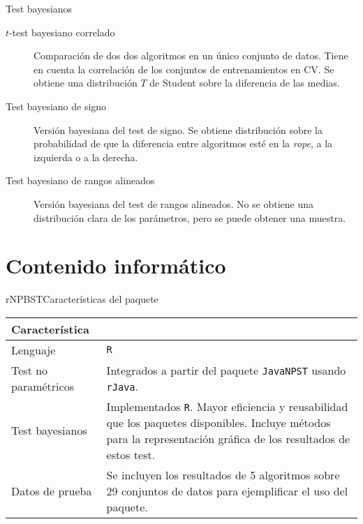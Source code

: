 \documentclass[leqno]{beamer}
\theoremstyle{definition_wo_parentheses}
\begin{document}
\begin{frame}{Test bayesianos}
\begin{description}
\item[$t$-test bayesiano correlado] Comparación de dos
dos algoritmos en un único conjunto de datos. Tiene en cuenta
la correlación de los conjuntos de entrenamientos en CV.
Se obtiene una distribución $T$ de Student sobre la
diferencia de las medias.
\item[Test bayesiano de signo] Versión bayesiana del test de 
signo. Se obtiene distribución sobre la probabilidad de que 
la diferencia entre algoritmos esté en la \textit{rope}, a la 
izquierda o a la derecha.
\item[Test bayesiano de rangos alineados] Versión bayesiana 
del test de rangos alineados. No se obtiene una distribución clara de los parámetros, 
pero se puede obtener una muestra. 
\end{description}
\end{frame}


\section{Contenido informático}

\begin{frame}[fragile]{rNPBST}{Características del paquete}

\begin{table}[]
\begin{tabularx}{\textwidth}{lX}
\toprule
Característica &    \\
\midrule
Lenguaje             & \texttt{R}\\
Test no paramétricos & Integrados a partir del paquete \texttt{JavaNPST} usando \texttt{rJava}.\\
Test bayesianos      & Implementados \texttt{R}. Mayor eficiencia y reusabilidad que los paquetes disponibles. 
						Incluye métodos para la representación gráfica de los resultados de estos test. \\
Datos de prueba      & Se incluyen los resultados de 5 algoritmos sobre 29 conjuntos de datos para ejemplificar el uso del paquete.\\
\bottomrule
\end{tabularx}
\end{table}
\end{frame}
\end{document}
